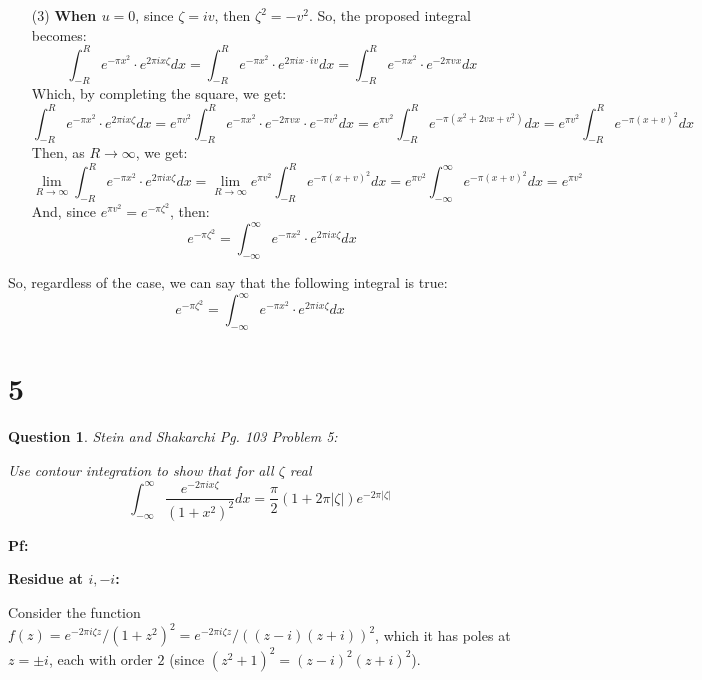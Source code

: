 \documentclass{article}
\newtheorem{question}{Question}
\begin{document}
\begin{itemize}
    \item[(3)] \textbf{When $u=0$}, since $\zeta=iv$, then $\zeta^2 = -v^2$. So, the proposed integral becomes:
    $$\int_{-R}^{R}e^{-\pi x^2}\cdot e^{2\pi ix\zeta}dx = \int_{-R}^{R}e^{-\pi x^2}\cdot e^{2\pi ix\cdot iv}dx = \int_{-R}^{R}e^{-\pi x^2}\cdot e^{-2\pi vx}dx$$
    Which, by completing the square, we get:
    $$\int_{-R}^{R}e^{-\pi x^2}\cdot e^{2\pi ix\zeta}dx = e^{\pi v^2}\int_{-R}^{R}e^{-\pi x^2}\cdot e^{-2\pi vx}\cdot e^{-\pi v^2}dx = e^{\pi v^2}\int_{-R}^{R}e^{-\pi(x^2+2vx+v^2)}dx = e^{\pi v^2}\int_{-R}^{R}e^{-\pi(x+v)^2}dx$$
    Then, as $R\rightarrow\infty$, we get:
    $$\lim_{R\rightarrow\infty}\int_{-R}^{R}e^{-\pi x^2}\cdot e^{2\pi ix\zeta}dx=\lim_{R\rightarrow\infty}e^{\pi v^2}\int_{-R}^{R}e^{-\pi(x+v)^2}dx = e^{\pi v^2}\int_{-\infty}^{\infty}e^{-\pi(x+v)^2}dx = e^{\pi v^2}$$
    And, since $e^{\pi v^2}=e^{-\pi \zeta^2}$, then:
    $$e^{-\pi \zeta^2} = \int_{-\infty}^{\infty}e^{-\pi x^2}\cdot e^{2\pi ix\zeta}dx$$
\end{itemize}

\hfil

So, regardless of the case, we can say that the following integral is true:
$$e^{-\pi \zeta^2} = \int_{-\infty}^{\infty}e^{-\pi x^2}\cdot e^{2\pi ix\zeta}dx$$

\hfil

\hfil

\section*{5}
\begin{myBox}[]{}
    \begin{question}
        Stein and Shakarchi Pg. 103 Problem 5:

        Use contour integration to show that for all $\zeta$ real
        $$\int_{-\infty}^{\infty}\frac{e^{-2\pi ix\zeta}}{(1+x^2)^2}dx = \frac{\pi}{2}(1+2\pi |\zeta|)e^{-2\pi |\zeta|}$$
    \end{question}
\end{myBox}

\textbf{Pf:}

\textbf{Residue at $i,-i$:}

Consider the function $f(z)=e^{-2\pi i\zeta z}/(1+z^2)^2 = e^{-2\pi i\zeta z}/((z-i)(z+i))^2$, which it has poles at $z=\pm i$, each with order $2$ (since $(z^2+1)^2=(z-i)^2(z+i)^2$).
\end{document}
